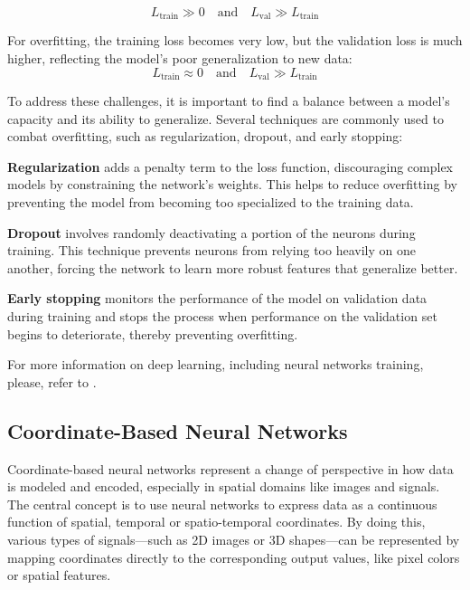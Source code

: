 
\[
  L_{\text{train}} \gg 0 \quad \text{and} \quad L_{\text{val}} \gg L_{\text{train}}
\]


For overfitting, the training loss becomes very low, but the validation loss is much higher, reflecting the model's poor generalization to new data: 
\[
  L_{\text{train}} \approx 0 \quad \text{and} \quad L_{\text{val}} \gg L_{\text{train}}
\]




To address these challenges, it is important to find a balance between a model's capacity and its ability to generalize. Several techniques are commonly used to combat overfitting, such as regularization, dropout, and early stopping:

\textbf{Regularization} adds a penalty term to the loss function, discouraging complex models by constraining the network's weights. This helps to reduce overfitting by preventing the model from becoming too specialized to the training data.
  
\textbf{Dropout} involves randomly deactivating a portion of the neurons during training. This technique prevents neurons from relying too heavily on one another, forcing the network to learn more robust features that generalize better.
  
\textbf{Early stopping} monitors the performance of the model on validation data during training and stops the process when performance on the validation set begins to deteriorate, thereby preventing overfitting.

For more information on deep learning, including neural networks training, please, refer to \cite{goodfellow2016deep}.


\subsection{Coordinate-Based Neural Networks}

Coordinate-based neural networks represent a change of perspective in how data is modeled and encoded, especially in spatial domains like images and signals. The central concept is to use neural networks to express data as a continuous function of spatial, temporal or spatio-temporal coordinates. By doing this, various types of signals—such as 2D images or 3D shapes—can be represented by mapping coordinates directly to the corresponding output values, like pixel colors or spatial features.

